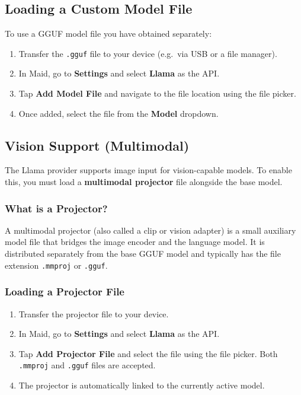 \documentclass[12pt,a4paper]{article}
\begin{document}
\subsection{Loading a Custom Model File}

To use a GGUF model file you have obtained separately:

\begin{enumerate}
    \item Transfer the \texttt{.gguf} file to your device (e.g.\ via USB or a file manager).
    \item In Maid, go to \textbf{Settings} and select \textbf{Llama} as the API.
    \item Tap \textbf{Add Model File} and navigate to the file location using the file picker.
    \item Once added, select the file from the \textbf{Model} dropdown.
\end{enumerate}

\subsection{Vision Support (Multimodal)}
\label{sec:llama-vision}

The Llama provider supports image input for vision-capable models. To enable this, you must load a \textbf{multimodal projector} file alongside the base model.

\subsubsection{What is a Projector?}

A multimodal projector (also called a clip or vision adapter) is a small auxiliary model file that bridges the image encoder and the language model. It is distributed separately from the base GGUF model and typically has the file extension \texttt{.mmproj} or \texttt{.gguf}.

\subsubsection{Loading a Projector File}

\begin{enumerate}
    \item Transfer the projector file to your device.
    \item In Maid, go to \textbf{Settings} and select \textbf{Llama} as the API.
    \item Tap \textbf{Add Projector File} and select the file using the file picker. Both \texttt{.mmproj} and \texttt{.gguf} files are accepted.
    \item The projector is automatically linked to the currently active model.
\end{enumerate}
\end{document}
